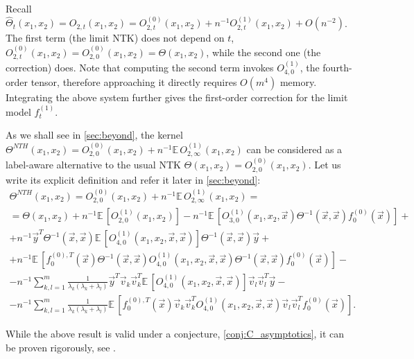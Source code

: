 \documentclass{article}
\newcommand{\EE}{\mathbb{E}\,}
\begin{document}
    Recall $\hat\Theta_t(x_1,x_2) = O_{2,t}(x_1,x_2) = O_{2,t}^{(0)}(x_1,x_2) + n^{-1} O_{2,t}^{(1)}(x_1,x_2) + O(n^{-2})$.
    The first term (the limit NTK) does not depend on $t$, $O_{2,t}^{(0)}(x_1,x_2) = O_{2,0}^{(0)}(x_1,x_2) = \Theta(x_1,x_2)$, while the second one (the correction) does.
    Note that computing the second term invokes $O_{4,0}^{(1)}$, the fourth-order tensor, therefore approaching it directly requires $O(m^4)$ memory.
    Integrating the above system further gives the first-order correction for the limit model $f_t^{(1)}$.

    As we shall see in \cref{sec:beyond}, the kernel $\Theta^{NTH}(x_1,x_2) = O_{2,0}^{(0)}(x_1,x_2) + n^{-1} \EE O_{2,\infty}^{(1)}(x_1,x_2)$ can be considered as a label-aware alternative to the usual NTK $\Theta(x_1,x_2) = O_{2,0}^{(0)}(x_1,x_2)$.
    Let us write its explicit definition and refer it later in \cref{sec:beyond}:
    \begin{multline}
        \Theta^{NTH}(x_1,x_2)
        = O_{2,0}^{(0)}(x_1,x_2) + n^{-1} \EE O_{2,\infty}^{(1)}(x_1,x_2)
        =\\= \Theta(x_1,x_2) + n^{-1} \EE\left[O_{2,0}^{(1)}(x_1,x_2)\right] - n^{-1} \EE\left[O_{3,0}^{(1)}(x_1, x_2, \vec x) \Theta^{-1}(\vec x,\vec x) f_0^{(0)}(\vec x)\right]
        +\\+ n^{-1} \vec y^T \Theta^{-1}(\vec x,\vec x) \EE\left[O_{4,0}^{(1)}(x_1, x_2, \vec x, \vec x)\right] \Theta^{-1}(\vec x,\vec x) \vec y
        +\\+ n^{-1} \EE\left[f_0^{(0),T}(\vec x) \Theta^{-1}(\vec x,\vec x) O_{4,0}^{(1)}(x_1, x_2, \vec x, \vec x) \Theta^{-1}(\vec x,\vec x) f_0^{(0)}(\vec x)\right]
        -\\- n^{-1} \sum_{k,l=1}^m \frac{1}{\lambda_k (\lambda_k+\lambda_l)} \vec y^T \vec v_k \vec v_k^T \EE\left[O_{4,0}^{(1)}(x_1, x_2, \vec x, \vec x)\right] \vec v_l \vec v_l^T \vec y
        -\\- n^{-1} \sum_{k,l=1}^m \frac{1}{\lambda_k (\lambda_k+\lambda_l)} \EE\left[f_0^{(0),T}(\vec x) \vec v_k \vec v_k^T O_{4,0}^{(1)}(x_1, x_2, \vec x, \vec x) \vec v_l \vec v_l^T f_0^{(0)}(\vec x)\right].
        \label{eq:lantk_nth}
    \end{multline}

    While the above result is valid under a conjecture, \cref{conj:C_asymptotics}, it can be proven rigorously, see \cite{huang2019dynamics}.
\end{document}
